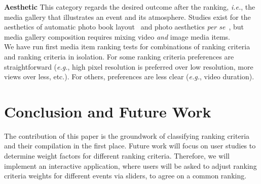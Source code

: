\documentclass[runningheads,a4paper,11pt]{llncs}
\begin{document}
\noindent \textbf{Aesthetic}
This category regards the desired outcome after the ranking, \emph{i.e.},
the media gallery that illustrates an event and its atmosphere.
Studies exist for the aesthetics of
automatic photo book layout~\cite{Photo2011}
and photo aesthetics \emph{per se}~\cite{Photo2012},
but media gallery composition requires mixing video \emph{and} image media items.\\

\noindent We have run first media item ranking tests for combinations
of ranking criteria and ranking criteria in isolation.
For some ranking criteria preferences are straightforward
(\emph{e.g.}, high pixel resolution is preferred over low resolution,
more views over less, etc.).
For others, preferences are less clear (\emph{e.g.}, video duration).

\section{Conclusion and Future Work}
The contribution of this paper is the groundwork of classifying ranking criteria
and their compilation in the first place.
Future work will focus on user studies to determine weight factors
for different ranking criteria.
Therefore, we will implement an interactive application,
where users will be asked to adjust ranking criteria weights
for different events via sliders, to agree on a common ranking.

\renewcommand{\ttdefault}{cmvtt}
\renewcommand\UrlFont\tt



\end{document}
